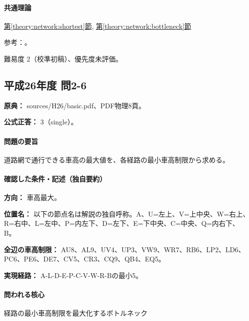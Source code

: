 \paragraph{共通理論} \hyperref[theory:network:shortest]{第\ref*{theory:network:shortest}節}, \hyperref[theory:network:bottleneck]{第\ref*{theory:network:bottleneck}節}

\par 参考：\cite{net_dijkstra}。

\par 難易度 2（校準初稿）、優先度未評価。

\subsection{平成26年度 問2-6}
\label{q:h26-reg-basic-2-6}

\noindent\textbf{原典：} sources/H26/basic.pdf、PDF物理8頁。

\textbf{公式正答：} 3（single）。

\paragraph{問題の要旨} 道路網で通行できる車高の最大値を、各経路の最小車高制限から求める。

\paragraph{確認した条件・記述（独自要約）}\mbox{}\par

\noindent\textbf{方向：} 車高最大。\par

\noindent\textbf{位置名：} 以下の節点名は解説の独自呼称。A、U=左上、V=上中央、W=右上、R=右中、L=左中、P=内左下、D=左下、E=下中央、C=中央、Q=内右下、B。\par

\noindent\textbf{全辺の車高制限：} AU8、AL9、UV4、UP3、VW9、WR7、RB6、LP2、LD6、PC6、PE6、DE7、CV5、CR3、CQ9、QB4、EQ5。\par

\noindent\textbf{実現経路：} A-L-D-E-P-C-V-W-R-Bの最小5。\par

\paragraph{問われる核心} 経路の最小車高制限を最大化するボトルネック

